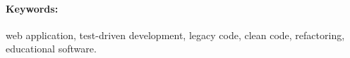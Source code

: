 \documentclass[12pt, oneside]{book}  %
\begin{document}
\paragraph*{Keywords:} web application, test-driven development, legacy code, clean code, refactoring, educational software.


%
%



\newpage 

\tableofcontents



\newpage 

\listoffigures
\listoftables


\mainmatter


 















\newpage	

\backmatter

\thispagestyle{empty}
\nocite{*}
\clearpage




 
\end{document}
